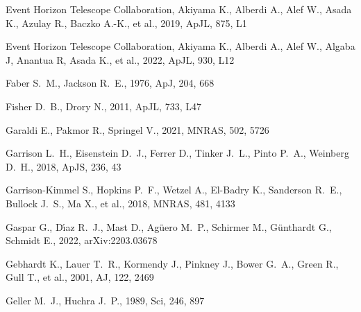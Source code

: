 \documentclass[fleqn,usenatbib]{mnras}
\begin{document}
\begin{thebibliography}{}
 Event Horizon Telescope Collaboration, Akiyama K., Alberdi A., Alef W., Asada K., Azulay R., Baczko A.-K., et al., 2019, ApJL, 875, L1

 Event Horizon Telescope Collaboration, Akiyama K., Alberdi A., Alef W., Algaba J, Anantua R, Asada K.,  et al., 2022, ApJL, 930, L12

 Faber S.~M., Jackson R.~E., 1976, ApJ, 204, 668

 Fisher D.~B., Drory N., 2011, ApJL, 733, L47


 Garaldi E., Pakmor R., Springel V., 2021, MNRAS, 502, 5726


 Garrison L.~H., Eisenstein D.~J., Ferrer D., Tinker J.~L., Pinto P.~A., Weinberg D.~H., 2018, ApJS, 236, 43

 Garrison-Kimmel S., Hopkins P.~F., Wetzel A., El-Badry K., Sanderson R.~E., Bullock J.~S., Ma X., et al., 2018, MNRAS, 481, 4133

 Gaspar G., D{\'\i}az R.~J., Mast D., Ag{\"u}ero M.~P., Schirmer M., G{\"u}nthardt G., Schmidt E., 2022, arXiv:2203.03678

 Gebhardt K., Lauer T.~R., Kormendy J., Pinkney J., Bower G.~A., Green R., Gull T., et al., 2001, AJ, 122, 2469

 Geller M.~J., Huchra J.~P., 1989, Sci, 246, 897


\end{thebibliography}
\end{document}
